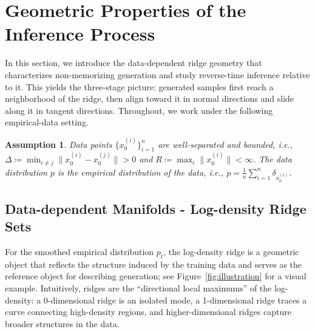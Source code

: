 \documentclass[11pt]{article}
\newtheorem{assumption}{Assumption}
\begin{document}
\section{Geometric Properties of the Inference Process}\label{sec:inference}
In this section, we introduce the data-dependent ridge geometry that characterizes non-memorizing generation and study reverse-time inference relative to it. This yields the three-stage picture: generated samples first reach a neighborhood of the ridge, then align toward it in normal directions and slide along it in tangent directions.
Throughout, we work under the following empirical-data setting.
\begin{assumption}\label{assump:data} Data points $\{x_0^{(i)}\}_{i=1}^n$ are well-separated and bounded, i.e., $\Delta\coloneqq \min_{i\neq j} \| x_0^{(i)}-x_0^{(j)} \|>0$ and $R \coloneqq \max_i \| x_0^{(i)} \|<\infty$.
The data distribution $p$ is the \emph{empirical} distribution of the data, i.e., $p= \tfrac{1}{n}\sum_{i=1}^n \delta_{x_0^{(i)}}$. 
\end{assumption}

\subsection{Data-dependent Manifolds - Log-density Ridge Sets}\label{sec:data assumption} 
\vspace{-.1cm}
For the smoothed empirical distribution $p_t$, the log-density ridge is a geometric object that reflects the structure induced by the training data and serves as the reference object for describing generation; see Figure~\ref{fig:illustration} for a visual example. Intuitively, ridges are the ``directional local maximums'' of the log-density: a 0-dimensional ridge is an isolated mode, a 1-dimensional ridge traces a curve connecting high-density regions, and higher-dimensional ridges capture broader structures in the data.
\end{document}
